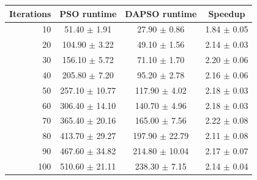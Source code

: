 \begin{tabular}{rccc}
\hline
Iterations & PSO runtime & DAPSO runtime & Speedup \\
\hline
10 & 51.40 $\pm$ 1.91 & 27.90 $\pm$ 0.86 & 1.84 $\pm$ 0.05 \\
20 & 104.90 $\pm$ 3.22 & 49.10 $\pm$ 1.56 & 2.14 $\pm$ 0.03 \\
30 & 156.10 $\pm$ 5.72 & 71.10 $\pm$ 1.70 & 2.20 $\pm$ 0.06 \\
40 & 205.80 $\pm$ 7.20 & 95.20 $\pm$ 2.78 & 2.16 $\pm$ 0.06 \\
50 & 257.10 $\pm$ 10.77 & 117.90 $\pm$ 4.02 & 2.18 $\pm$ 0.03 \\
60 & 306.40 $\pm$ 14.10 & 140.70 $\pm$ 4.96 & 2.18 $\pm$ 0.03 \\
70 & 365.40 $\pm$ 20.16 & 165.00 $\pm$ 7.56 & 2.22 $\pm$ 0.08 \\
80 & 413.70 $\pm$ 29.27 & 197.90 $\pm$ 22.79 & 2.11 $\pm$ 0.08 \\
90 & 467.60 $\pm$ 34.82 & 214.80 $\pm$ 10.04 & 2.17 $\pm$ 0.07 \\
100 & 510.60 $\pm$ 21.11 & 238.30 $\pm$ 7.15 & 2.14 $\pm$ 0.04 \\
\hline
\end{tabular}